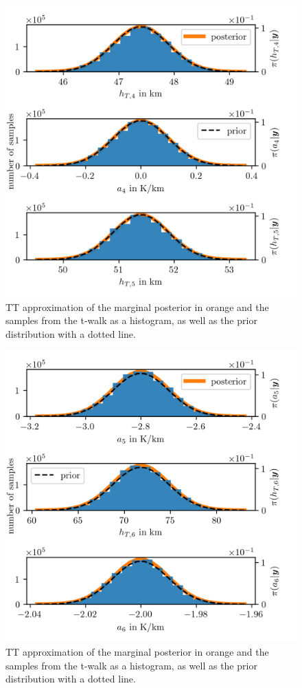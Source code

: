 \begin{figure}[ht!]
	\centering
	\includegraphics{PHdPTPost4.png}
	\caption[Histograms and TT approximation of posterior distribution as well as hyper-prior distribution.]{TT approximation of the marginal posterior in orange and the samples from the t-walk as a histogram, as well as the prior distribution with a dotted line.}
	\label{fig:PostHistTT4}
\end{figure}
\begin{figure}[ht!]
	\centering
	\includegraphics{PHdPTPost5.png}
	\caption[Histograms and TT approximation of posterior distribution as well as hyper-prior distribution.]{TT approximation of the marginal posterior in orange and the samples from the t-walk as a histogram, as well as the prior distribution with a dotted line.}
	\label{fig:PostHistTT5}
\end{figure}

